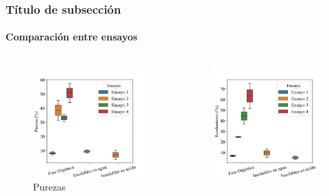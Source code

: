\documentclass[aspectratio=1610]{beamer}
\newcommand{\ssec}{Título de subsección}
\begin{document}
\begin{frame}
	\frametitle{\ssec}
	\framesubtitle{Comparación entre ensayos}
	\vspace{-2.5em}
	\begin{columns}
	\begin{center}
	\begin{figure}
	\includegraphics[height=0.7\textheight]{figs/purificacion-pureza-vs-prueba.png}
	\caption{Purezas}
	\end{figure}
	\end{center}
	\begin{center}
	\begin{figure}
	\includegraphics[height=0.7\textheight]{figs/purificacion-rendimiento-vs-prueba.png}

\end{figure}
\end{center}
\end{columns}
\end{frame}
\end{document}
